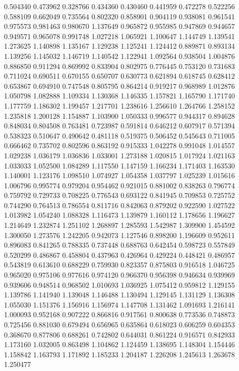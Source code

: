 0.504340
0.473962
0.328766
0.434360
0.430460
0.441959
0.472278
0.522256
0.588109
0.662049
0.735564
0.802320
0.858901
0.904119
0.938081
0.961541
0.975573
0.981463
0.980670
1.137649
0.965872
0.955985
0.947869
0.944657
0.949571
0.965078
0.991748
1.027218
1.065921
1.100647
1.144749
1.139541
1.273625
1.140898
1.135167
1.129238
1.125241
1.124412
0.889871
0.893134
1.139256
1.145032
1.146719
1.140542
1.122941
1.092564
0.938504
1.004876
0.886850
0.911294
0.869992
0.833904
0.802975
0.776445
0.753120
0.731683
0.711024
0.690511
0.670155
0.650707
0.630773
0.621894
0.618745
0.628412
0.653867
0.694910
0.747548
0.805795
0.864214
0.919217
0.968989
1.012876
1.050798
1.082888
1.109334
1.130368
1.146335
1.157821
1.165790
1.171740
1.177759
1.186302
1.199457
1.217701
1.238616
1.256610
1.264766
1.258152
1.235818
1.200128
1.154887
1.103900
1.050333
0.996577
0.944317
0.894628
0.848034
0.804508
0.763481
0.723987
0.591814
0.646212
0.607917
0.571394
0.538323
0.510647
0.490642
0.481118
0.519375
0.506452
0.545643
0.711005
0.666462
0.735702
0.802596
0.863192
0.915333
1.042278
0.991048
1.014557
1.029238
1.036179
1.036836
1.033001
1.273188
1.020815
1.017924
1.021163
1.033033
1.052500
1.084289
1.117550
1.147159
1.166234
1.171403
1.163530
1.140001
1.123176
1.098510
1.074927
1.054358
1.037797
1.025239
1.015616
1.006796
0.995774
0.979204
0.954462
0.921015
0.881002
0.838263
0.796774
0.759792
0.729733
0.708225
0.776543
0.693122
0.841945
0.709853
0.725752
0.744290
0.764513
0.786554
0.811716
0.842063
0.879202
0.922590
1.027522
1.013982
1.054240
1.088328
1.116473
1.139879
1.160112
1.178656
1.196627
1.214649
1.232874
1.251102
1.268897
1.285593
1.542987
1.309900
1.454592
1.300050
1.273576
1.242205
0.942073
1.127546
0.898200
1.196609
0.952611
0.896083
0.841265
0.788335
0.737448
0.688763
0.642454
0.598723
0.557849
0.520299
0.486867
0.458804
0.437963
0.426964
0.429224
0.448421
0.486957
0.543819
0.613610
0.688229
0.759930
0.823357
0.875803
0.916518
1.046725
0.965020
0.975106
0.977616
0.974120
0.966370
0.956398
0.946634
0.939969
0.939606
0.948514
0.968502
1.010693
1.036925
1.075412
0.959812
1.129155
1.139786
1.141940
1.139048
1.146488
1.130494
1.129145
1.131129
1.136308
1.055030
1.151376
1.156916
1.156974
1.147708
1.131462
1.091693
1.216141
1.000093
0.952168
0.907222
0.866816
0.917561
0.800638
0.773536
0.748873
0.725456
0.881030
0.679494
0.656965
0.635864
0.618023
0.606259
0.604353
0.368670
0.877806
0.688261
0.742802
0.644031
0.861224
0.916571
0.842933
1.173160
1.032005
0.863498
1.104862
1.124459
1.138695
1.148304
1.154446
1.158842
1.163793
1.171892
1.185233
1.204187
1.226208
1.245613
1.263678
1.250477
